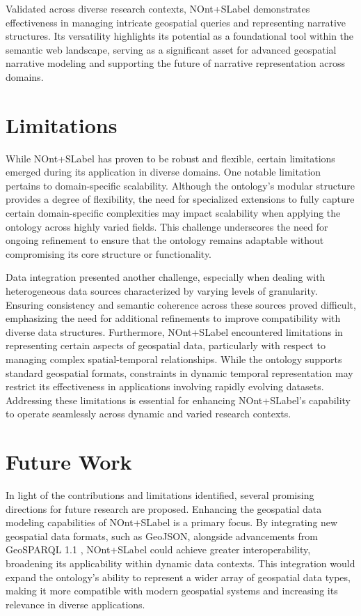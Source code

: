 Validated across diverse research contexts, \acrshort{NOnt+SLabel} demonstrates effectiveness in managing intricate geospatial queries and representing narrative structures. Its versatility highlights its potential as a foundational tool within the semantic web landscape, serving as a significant asset for advanced geospatial narrative modeling and supporting the future of narrative representation across domains.

\section{Limitations}

While \acrshort{NOnt+SLabel} has proven to be robust and flexible, certain limitations emerged during its application in diverse domains. One notable limitation pertains to domain-specific scalability. Although the ontology’s modular structure provides a degree of flexibility, the need for specialized extensions to fully capture certain domain-specific complexities may impact scalability when applying the ontology across highly varied fields. This challenge underscores the need for ongoing refinement to ensure that the ontology remains adaptable without compromising its core structure or functionality.

Data integration presented another challenge, especially when dealing with heterogeneous data sources characterized by varying levels of granularity. Ensuring consistency and semantic coherence across these sources proved difficult, emphasizing the need for additional refinements to improve compatibility with diverse data structures. Furthermore, \acrshort{NOnt+SLabel} encountered limitations in representing certain aspects of geospatial data, particularly with respect to managing complex spatial-temporal relationships. While the ontology supports standard geospatial formats, constraints in dynamic temporal representation may restrict its effectiveness in applications involving rapidly evolving datasets. Addressing these limitations is essential for enhancing \acrshort{NOnt+SLabel}’s capability to operate seamlessly across dynamic and varied research contexts.

\section{Future Work}

In light of the contributions and limitations identified, several promising directions for future research are proposed. Enhancing the geospatial data modeling capabilities of \acrshort{NOnt+SLabel} is a primary focus. By integrating new geospatial data formats, such as GeoJSON, alongside advancements from GeoSPARQL 1.1 \cite{carGeoSPARQL11Motivations2022}, \acrshort{NOnt+SLabel} could achieve greater interoperability, broadening its applicability within dynamic data contexts. This integration would expand the ontology’s ability to represent a wider array of geospatial data types, making it more compatible with modern geospatial systems and increasing its relevance in diverse applications.

